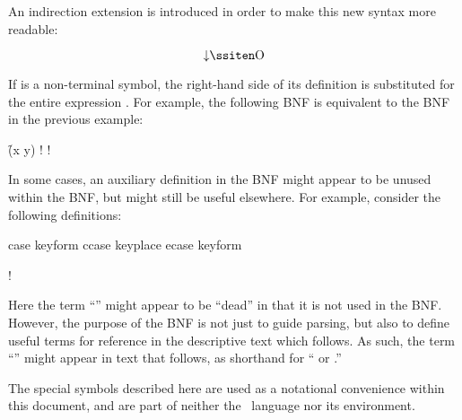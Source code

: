 
An indirection extension is introduced in order to make this
new syntax more readable:

$$\hbox{\down{O}}$$

\noindent If  is a non-terminal symbol, the right-hand side
of its definition is substituted for the entire expression 
.  For example, the following BNF is equivalent to
the BNF in the previous example:

\f{(x  y)}
\Vskip 1pc!
\Vskip 1pc!

\endsubsubsubsection%


In some cases, an auxiliary definition in the BNF might appear to be unused
within the BNF, but might still be useful elsewhere.  For example, consider the
following definitions:

\DefmacWithValues case
		  {keyform   }
		  {}
\DefmacWithValues ccase
		  {keyplace }
		  {}
\DefmacWithValues ecase
		  {keyform  }
		  {}

\Vskip 1pc!

Here the term ``'' might appear to be ``dead'' in that it
is not used in the BNF.  However, the purpose of the BNF is not just to guide parsing,
but also to define useful terms for reference in the descriptive text which follows.
As such, the term ``'' might appear in text that follows,
as shorthand for `` or .''

\endsubsubsubsection%

\endsubsubsection%

The special symbols described here are used as a notational convenience
within this document, and are part of neither the \clisp\ language nor
its environment.

